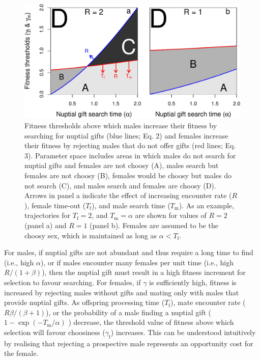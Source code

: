\documentclass[
]{article}
\begin{document}
\begin{figure}
\centering
\includegraphics{ms_files/figure-latex/unnamed-chunk-3-1.pdf}
\caption{Fitness thresholds above which males increase their fitness by
searching for nuptial gifts (blue lines; Eq. 2) and females increase
their fitness by rejecting males that do not offer gifts (red lines; Eq.
3). Parameter space includes areas in which males do not search for
nuptial gifts and females are not choosy (A), males search but females
are not choosy (B), females would be choosy but males do not search (C),
and males search and females are choosy (D). Arrows in panel a indicate
the effect of increasing encounter rate (\(R\)), female time-out
(\(T_{\mathrm{f}}\)), and male search time (\(T_{\mathrm{m}}\)). As an
example, trajectories for \(T_{\mathrm{f}} = 2\), and
\(T_{\mathrm{m}} = \alpha\) are shown for values of \(R=2\) (panel a)
and \(R = 1\) (panel b). Females are assumed to be the choosy sex, which
is maintained as long as \(\alpha < T_{\mathrm{f}}\).}
\end{figure}

For males, if nuptial gifts are not abundant and thus require a long
time to find (i.e., high \(\alpha\)), or if males encounter many females
per unit time (i.e., high \(R / (1+\beta)\)), then the nuptial gift must
result in a high fitness increment for selection to favour searching.
For females, if \(\gamma\) is sufficiently high, fitness is increased by
rejecting males without gifts and mating only with males that provide
nuptial gifts. As offspring processing time (\(T_{\mathrm{f}}\)), mate
encounter rate (\(R\beta / (\beta + 1)\)), or the probability of a male
finding a nuptial gift (\(1 - \exp(-T_{\mathrm{m}}/\alpha)\) ) decrease,
the threshold value of fitness above which selection will favour
choosiness (\(\gamma_{\mathrm{f}}\)) increases. This can be understood
intuitively by realising that rejecting a prospective male represents an
opportunity cost for the female.
\end{document}
